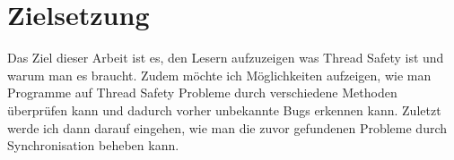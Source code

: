 \section{Zielsetzung}

Das Ziel dieser Arbeit ist es, den Lesern aufzuzeigen was Thread Safety ist und warum man es braucht. Zudem möchte ich Möglichkeiten aufzeigen, wie man Programme auf Thread Safety Probleme durch verschiedene Methoden überprüfen kann und dadurch vorher unbekannte Bugs erkennen kann. Zuletzt werde ich dann darauf eingehen, wie man die zuvor gefundenen Probleme durch Synchronisation beheben kann.
